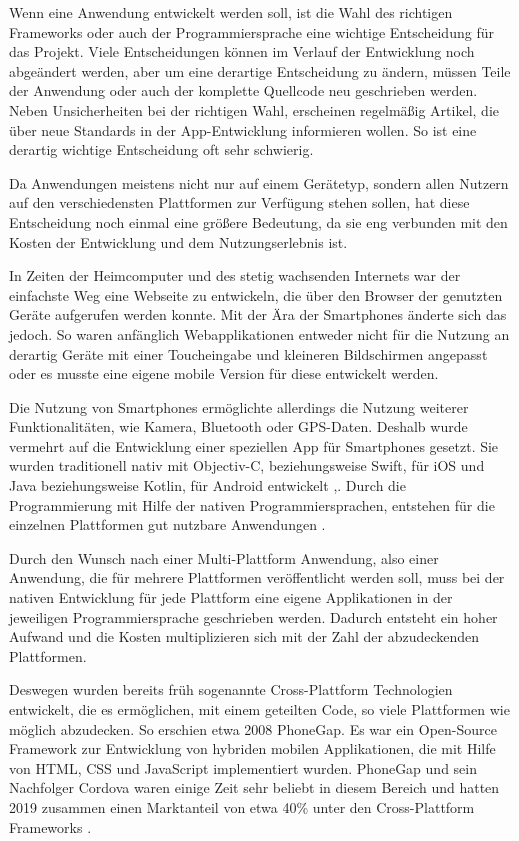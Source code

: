 Wenn eine Anwendung entwickelt werden soll, ist die Wahl des richtigen Frameworks oder auch der Programmiersprache eine wichtige Entscheidung für das Projekt. Viele Entscheidungen können im Verlauf der Entwicklung noch abgeändert werden, aber um eine derartige Entscheidung zu ändern, müssen Teile der Anwendung oder auch der komplette Quellcode neu geschrieben werden. Neben Unsicherheiten bei der richtigen Wahl, erscheinen regelmäßig Artikel, die über neue Standards in der App-Entwicklung informieren wollen. So ist eine derartig wichtige Entscheidung oft sehr schwierig.

Da Anwendungen meistens nicht nur auf einem Gerätetyp, sondern allen Nutzern auf den verschiedensten Plattformen zur Verfügung stehen sollen, hat diese Entscheidung noch einmal eine größere Bedeutung, da sie eng verbunden mit den Kosten der Entwicklung und dem Nutzungserlebnis ist.

In Zeiten der Heimcomputer und des stetig wachsenden Internets war der einfachste Weg eine Webseite zu entwickeln, die über den Browser der genutzten Geräte aufgerufen werden konnte. Mit der Ära der Smartphones änderte sich das jedoch. So waren anfänglich Webapplikationen entweder nicht für die Nutzung an derartig Geräte mit einer Toucheingabe und kleineren Bildschirmen angepasst oder es musste eine eigene mobile Version für diese entwickelt werden\cite{Bryant2012}.

Die Nutzung von Smartphones ermöglichte allerdings die Nutzung weiterer Funktionalitäten, wie Kamera, Bluetooth oder GPS-Daten. Deshalb wurde vermehrt auf die Entwicklung einer speziellen App für Smartphones gesetzt. Sie wurden traditionell nativ mit Objectiv-C, beziehungsweise Swift, für iOS und Java beziehungsweise Kotlin, für Android entwickelt \cite{ELKASSAS2017163},\cite{researchgate_thomas}. Durch die Programmierung mit Hilfe der nativen Programmiersprachen, entstehen für die einzelnen Plattformen gut nutzbare Anwendungen \cite{researchgate_thomas}.

Durch den Wunsch nach einer Multi-Plattform Anwendung, also einer Anwendung, die für mehrere Plattformen veröffentlicht werden soll, muss bei der nativen Entwicklung für jede Plattform eine eigene Applikationen in der jeweiligen Programmiersprache geschrieben werden. Dadurch entsteht ein hoher Aufwand und die Kosten multiplizieren sich mit der Zahl der abzudeckenden Plattformen.

Deswegen wurden bereits früh sogenannte Cross-Plattform Technologien entwickelt, die es ermöglichen, mit einem geteilten Code, so viele Plattformen wie möglich abzudecken. So erschien etwa 2008 PhoneGap. Es war ein Open-Source Framework zur Entwicklung von hybriden mobilen Applikationen, die mit Hilfe von HTML, CSS und JavaScript implementiert wurden. PhoneGap und sein Nachfolger Cordova waren einige Zeit sehr beliebt in diesem Bereich und hatten 2019 zusammen einen Marktanteil von etwa 40\% unter den Cross-Plattform Frameworks \cite{statist_CP_Framework}.

